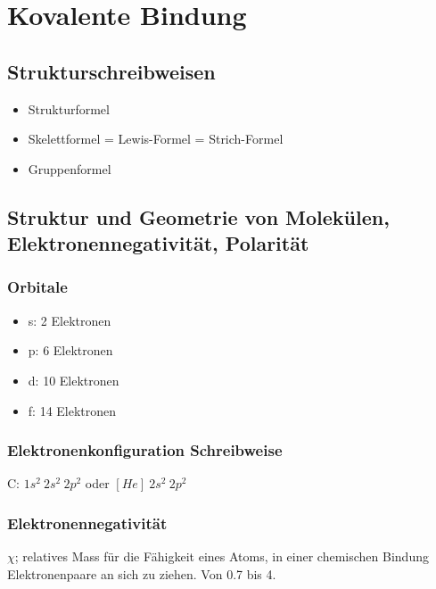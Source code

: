 \section{Kovalente Bindung}

\subsection{Strukturschreibweisen}

\begin{itemize}
	\item Strukturformel
	\item Skelettformel = Lewis-Formel = Strich-Formel
	\item Gruppenformel
\end{itemize}

\subsection{Struktur und Geometrie von Molekülen, Elektronennegativität, Polarität}



\subsubsection{Orbitale}

\begin{itemize}
	\item s: 2 Elektronen
	\item p: 6 Elektronen
	\item d: 10 Elektronen
	\item f: 14 Elektronen
\end{itemize}

\subsubsection{Elektronenkonfiguration Schreibweise}

C: $1s^2 \ 2s^2 \ 2p^2$ oder $[He] \ 2s^2 \ 2p^2$

\subsubsection{Elektronennegativität}

\begin{definition}[Elektronennegativität]
	$\chi$; relatives Mass für die Fähigkeit eines Atoms, in einer chemischen Bindung Elektronenpaare an sich zu ziehen. Von 0.7 bis 4.
\end{definition}

